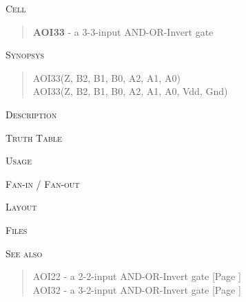 
\label{AOI33}
\textsc{Cell}
\begin{quote}
    \textbf{AOI33} - a 3-3-input AND-OR-Invert gate
\end{quote}

\textsc{Synopsys}
\begin{quote}
    AOI33(Z, B2, B1, B0, A2, A1, A0) \\
    AOI33(Z, B2, B1, B0, A2, A1, A0, Vdd, Gnd)
\end{quote}

\textsc{Description}

%

\textsc{Truth Table}


\textsc{Usage}

\textsc{Fan-in / Fan-out}

\textsc{Layout}

\textsc{Files}

\textsc{See also}
\begin{quote}
    AOI22 - a 2-2-input AND-OR-Invert gate [Page \pageref{AOI22}] \\
    AOI32 - a 3-2-input AND-OR-Invert gate [Page \pageref{AOI32}]
\end{quote}
